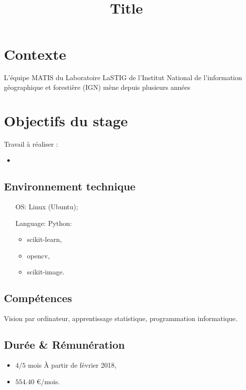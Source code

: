\documentclass[a4paper,11pt]{article}
\title{Title}
\date{}
\begin{document}
    \maketitle

    \section*{Contexte}
    \noindent
    \par
    L'équipe MATIS du Laboratoire LaSTIG de l'Institut National de l'information géographique et forestière (IGN) mène depuis plusieurs années

    \section*{Objectifs du stage}


    Travail à réaliser :
    \begin{itemize}
    \item
    \end{itemize}



    \subsection*{Environnement technique}
    \begin{itemize}
        \item[OS:] Linux (Ubuntu);
        \item[Language:] Python:
        \begin{itemize}
            \item scikit-learn,
            \item opencv,
            \item scikit-image.
        \end{itemize}
    \end{itemize}

    \subsection*{Compétences}
    Vision par ordinateur, apprentissage statistique, programmation informatique.


    \subsection*{Durée \& Rémunération}
    \begin{itemize}
        \item $4/5$ mois \`A partir de février 2018,
        \item $554.40$ \euro/mois.
    \end{itemize}
\end{document}
